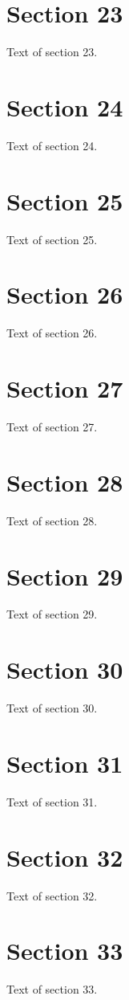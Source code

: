 \documentclass{article}
\begin{document}
\section{Section 23}
Text of section 23.

\section{Section 24}
Text of section 24.

\section{Section 25}
Text of section 25.

\section{Section 26}
Text of section 26.

\section{Section 27}
Text of section 27.

\section{Section 28}
Text of section 28.

\section{Section 29}
Text of section 29.

\section{Section 30}
Text of section 30.

\section{Section 31}
Text of section 31.

\section{Section 32}
Text of section 32.

\section{Section 33}
Text of section 33.
\end{document}
